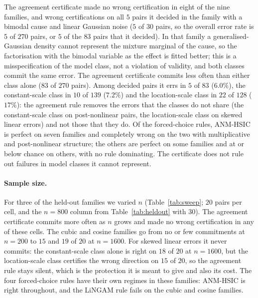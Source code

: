 The agreement certificate made no wrong certification in eight of the nine
families, and wrong certifications on all $5$ pairs it decided in the family with
a bimodal cause and linear Gaussian noise ($5$ of $30$ pairs, so the overall
error rate is $5$ of $270$ pairs, or $5$ of the $83$ pairs that it decided). In that
family a generalised-Gaussian density cannot represent the mixture marginal of
the cause, so the factorisation with the bimodal variable as the effect is
fitted better; this is a misspecification of the model class, not a violation of
validity, and both classes commit the same error. The agreement certificate
commits less often than either class alone ($83$ of $270$ pairs). Among decided
pairs it errs in $5$ of $83$ ($6.0\%$), the constant-scale class in $10$ of $139$
($7.2\%$) and the location-scale class in $22$ of $128$ ($17\%$): the agreement rule
removes the errors that the classes do not share (the constant-scale class on
post-nonlinear pairs, the location-scale class on skewed linear errors) and not
those that they do. Of the forced-choice rules, ANM-HSIC is perfect on seven families and
completely wrong on the two with multiplicative and post-nonlinear structure; the
others are perfect on some families and at or below chance on others, with no rule
dominating. The certificate does not rule out failures in model classes it cannot represent.


\paragraph{Sample size.} For three of the held-out families we varied $n$
(Table~\ref{tab:sweep}; $20$ pairs per cell, and the $n=800$ column from
Table~\ref{tab:heldout} with $30$). The agreement certificate commits more
often as $n$ grows and made no wrong certification in any of these cells. The
cubic and cosine families go from no or few commitments at $n=200$ to $15$ and
$19$ of $20$ at $n=1600$. For skewed linear errors it never commits: the
constant-scale class alone is right on $18$ of $20$ at $n=1600$, but the
location-scale class certifies the wrong direction on $15$ of $20$, so the
agreement rule stays silent, which is the protection it is meant to give and also
its cost. The four forced-choice rules have their own regimes in these families:
ANM-HSIC is right throughout, and the LiNGAM rule fails on the cubic and cosine
families.

